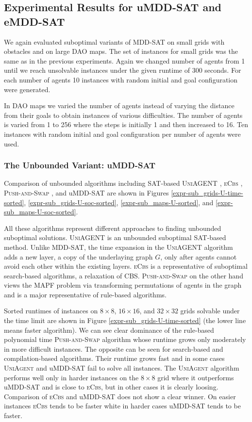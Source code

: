 \documentclass[jair,oneside,11pt]{article}
\begin{document}
\subsection{Experimental Results for uMDD-SAT and eMDD-SAT}

We again evaluated suboptimal variants of MDD-SAT on small grids with obstacles and on large DAO maps. The set of instances for small grids was the same as in the previous experiments. Again we changed number of agents from 1 until we reach unsolvable instances under the given runtime of 300 seconds. For each number of agents 10 instances with random initial and goal configuration were generated.

In DAO maps we varied the number of agents instead of varying the distance from their goals to obtain instances of various difficulties. The number of agents is varied from 1 to 256 where the steps is initially 1 and then increased to 16. Ten instances with random initial and goal configuration per number of agents were used.

\subsubsection{The Unbounded Variant: uMDD-SAT}

Comparison of unbounded algorithms including SAT-based \textsc{UniAGENT} \cite{DBLP:conf/ijcai/Surynek15}, \textsc{eCbs} \cite{DBLP:conf/ecai/BarerSSF14}, \textsc{Push-and-Swap} \cite{DBLP:conf/aaai/LunaB11}, and uMDD-SAT are shown in Figures \ref{expr-sub_grids-U-time-sorted}, \ref{expr-sub_grids-U-soc-sorted}, \ref{expr-sub_maps-U-sorted}, and \ref{expr-sub_maps-U-soc-sorted}.

All these algorithms represent different approaches to finding unbounded suboptimal solutions. \textsc{UniAGENT} is an unbounded suboptimal SAT-based method. Unlike MDD-SAT, the time expansion in the \textsc{UniAGENT} algorithm adds a new layer, a copy of the underlaying graph $G$, only after agents cannot avoid each other within the existing layers. \textsc{eCbs} is a representative of suboptimal search-based algorithms, a relaxation of CBS. \textsc{Push-and-Swap} on the other hand views the MAPF problem via transforming permutations of agents in the graph and is a major representative of rule-based algorithms.

Sorted runtimes of instances on $8{}\times{}8$, $16{}\times{}16$, and $32{}\times{}32$ grids solvable under the time limit are shown in Figure \ref{expr-sub_grids-U-time-sorted} (the lower line means faster algorithm). We can see clear dominance of the rule-based polynomial time \textsc{Push-and-Swap} algorithm whose runtime grows only moderately in more difficult instances. The opposite can be seen for search-based and compilation-based algorithms. Their runtime grows fast and in some cases \textsc{UniAgent} and uMDD-SAT fail to solve all instances. The \textsc{UniAgent} algorithm performs well only in harder instances on the $8{}\times{}8$ grid where it outperforms uMDD-SAT and is close to \textsc{eCbs}, but in other cases it is clearly loosing. Comparison of \textsc{eCbs} and uMDD-SAT does not show a clear winner. On easier instances \textsc{eCbs} tends to be faster white in harder cases uMDD-SAT tends to be faster.
\end{document}
